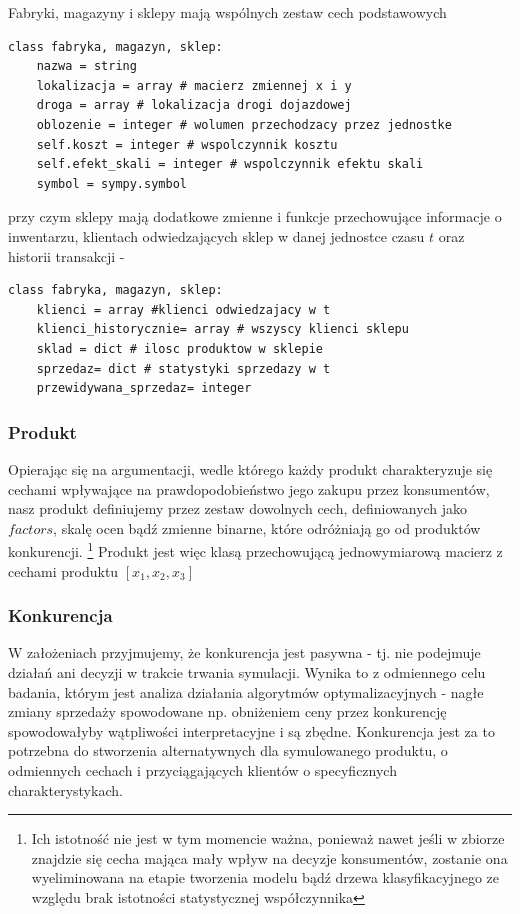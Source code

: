 \documentclass{article}
\begin{document}
Fabryki, magazyny i sklepy mają wspólnych zestaw cech podstawowych 

\begin{lstlisting}[frame=single]  
class fabryka, magazyn, sklep:   
	nazwa = string
	lokalizacja = array # macierz zmiennej x i y
	droga = array # lokalizacja drogi dojazdowej
	oblozenie = integer # wolumen przechodzacy przez jednostke
	self.koszt = integer # wspolczynnik kosztu
	self.efekt_skali = integer # wspolczynnik efektu skali	
	symbol = sympy.symbol 
\end{lstlisting}

przy czym sklepy mają dodatkowe zmienne i funkcje przechowujące informacje o inwentarzu, klientach odwiedzających sklep w danej jednostce czasu $t$ oraz historii transakcji - 

\begin{lstlisting}[frame=single]  
class fabryka, magazyn, sklep:   
	klienci = array #klienci odwiedzajacy w t
	klienci_historycznie= array # wszyscy klienci sklepu
	sklad = dict # ilosc produktow w sklepie
	sprzedaz= dict # statystyki sprzedazy w t
	przewidywana_sprzedaz= integer 
\end{lstlisting}


\subsubsection{Produkt}

Opierając się na argumentacji, wedle którego każdy produkt charakteryzuje się cechami wpływające na prawdopodobieństwo jego zakupu przez konsumentów, nasz produkt definiujemy przez zestaw dowolnych cech, definiowanych jako $factors$, skalę ocen bądź zmienne binarne, które odróżniają go od produktów konkurencji. \footnote{Ich istotność nie jest w tym momencie ważna, ponieważ nawet jeśli w zbiorze znajdzie się cecha mająca mały wpływ na decyzje konsumentów, zostanie ona wyeliminowana na etapie tworzenia modelu bądź drzewa klasyfikacyjnego ze względu brak istotności statystycznej współczynnika} Produkt jest więc klasą przechowującą jednowymiarową macierz z cechami produktu $[x_1,x_2,x_3]$

\subsubsection{Konkurencja}
 
W założeniach przyjmujemy, że konkurencja jest pasywna - tj. nie podejmuje działań ani decyzji w trakcie trwania symulacji. Wynika to z odmiennego celu badania, którym jest analiza działania algorytmów optymalizacyjnych - nagłe zmiany sprzedaży spowodowane np. obniżeniem ceny przez konkurencję spowodowałyby wątpliwości interpretacyjne i są zbędne. Konkurencja jest za to potrzebna do stworzenia alternatywnych dla symulowanego produktu, o odmiennych cechach i przyciągających klientów o specyficznych charakterystykach. 
\end{document}
